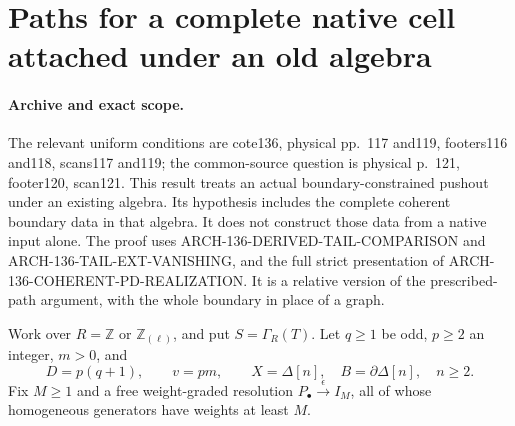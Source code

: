 \section{Paths for a complete native cell attached under an old algebra}
\label{sec:136-relative-cell-paths}

\paragraph{Archive and exact scope.}
The relevant uniform conditions are cote136, physical pp.~117 and119,
footers116 and118, scans117 and119; the common-source question is
physical p.~121, footer120, scan121. This result treats an actual
boundary-constrained pushout under an existing algebra. Its hypothesis
includes the complete coherent boundary data in that algebra. It does
not construct those data from a native input alone. The proof uses
ARCH-136-DERIVED-TAIL-COMPARISON and ARCH-136-TAIL-EXT-VANISHING,
and the full strict presentation of
ARCH-136-COHERENT-PD-REALIZATION. It is a relative version of the
prescribed-path argument, with the whole boundary in place of a graph.

Work over \(R=\mathbb Z\) or \(\mathbb Z_{(\ell)}\), and put
\(S=\Gamma_R(T)\). Let \(q\geq1\) be odd, \(p\geq2\) an
integer, \(m>0\), and
\[
             D=p(q+1),\qquad v=pm,\qquad
             X=\Delta[n],\quad B=\partial\Delta[n],
             \quad n\geq2.                              \tag{136.RC1}
\]
Fix \(M\geq1\) and a free weight-graded resolution
\(P_\bullet\xrightarrow{\epsilon}I_M\), all of whose
homogeneous generators have weights at least \(M\).

